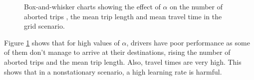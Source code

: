 \documentclass{RITA}
\begin{document}
\begin{figure}[ht]
  \centering
  \caption{Box-and-whisker charts showing the effect of $\alpha$ on the number of aborted trips , the mean trip length  and mean travel time  in the grid scenario.}
  \label{fig:qLearningAlpha-grid}
\end{figure}

Figure \ref{fig:qLearningAlpha-grid} shows that for high values of $\alpha$, drivers have poor performance as some of them don't manage to arrive at their destinations, rising the number of aborted trips and the mean trip length. Also, travel times are very high. This shows that in a nonstationary scenario, a high learning rate is harmful.
\end{document}
